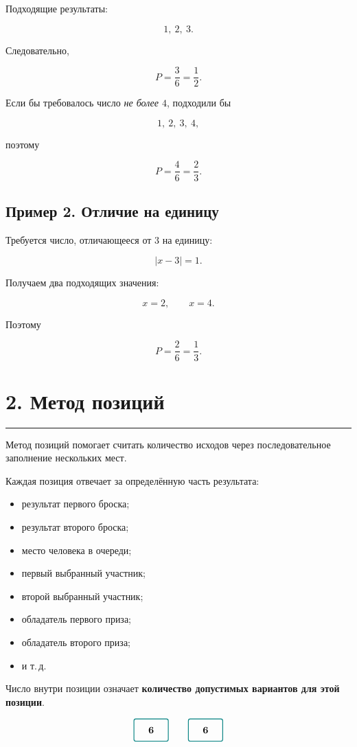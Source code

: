 \documentclass[a4paper,12pt]{article}
\newcommand{\sectionline}{%
    \vspace{0.2em}
    {\color{accent}\rule{\linewidth}{0.7pt}}
    \vspace{0.4em}
}
\newcommand{\positionbox}[1]{%
    \tikz[baseline=-0.7ex]\node[
        draw=accent,
        rounded corners=2pt,
        minimum width=1.25cm,
        minimum height=0.8cm,
        line width=0.8pt
    ]{\textbf{#1}};%
}
\begin{document}
Подходящие результаты:

\[
1,\ 2,\ 3.
\]

Следовательно,

\[
P=\frac{3}{6}=\frac12.
\]

Если бы требовалось число \emph{не более \(4\)}, подходили бы

\[
1,\ 2,\ 3,\ 4,
\]

поэтому

\[
P=\frac46=\frac23.
\]

\subsection*{Пример 2. Отличие на единицу}

Требуется число, отличающееся от \(3\) на единицу:

\[
|x-3|=1.
\]

Получаем два подходящих значения:

\[
x=2,\qquad x=4.
\]

Поэтому

\[
P=\frac26=\frac13.
\]

\newpage

\section*{2. Метод позиций}
\sectionline

Метод позиций помогает считать количество исходов через последовательное заполнение нескольких мест.

Каждая позиция отвечает за определённую часть результата:

\begin{itemize}[leftmargin=1.5em]
    \item результат первого броска;
    \item результат второго броска;
    \item место человека в очереди;
    \item первый выбранный участник;
    \item второй выбранный участник;
    \item обладатель первого приза;
    \item обладатель второго приза;
    \item и т.\,д.
\end{itemize}

Число внутри позиции означает \textbf{количество допустимых вариантов для этой позиции}.

\[
\positionbox{6}
\qquad
\positionbox{6}
\]
\end{document}
